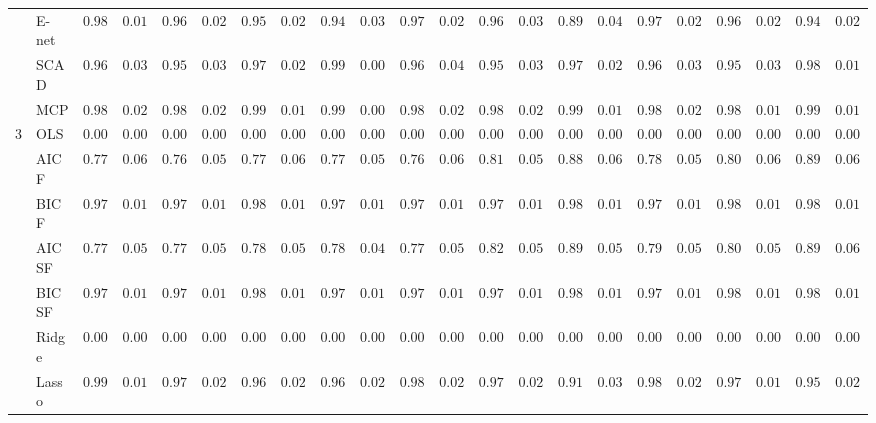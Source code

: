 \begin{tabular}{ll|ll|llllll|llllll|llllll}
 & E-net  & $0.9854$ & $0.0169$ & $0.9659$ & $0.0285$ & $0.9578$ & $0.0271$ & $0.9473$ & $0.0322$ & $0.9791$ & $0.0264$ & $0.9686$ & $0.0318$ & $0.8998$ & $0.0403$ & $0.9785$ & $0.0206$ & $0.9619$ & $0.0238$ & $0.9473$ & $0.0277$ \\
 & SCAD  & $0.9625$ & $0.0383$ & $0.9567$ & $0.0374$ & $0.9760$ & $0.0254$ & $0.9979$ & $0.0066$ & $0.9601$ & $0.0460$ & $0.9581$ & $0.0377$ & $0.9772$ & $0.0299$ & $0.9624$ & $0.0372$ & $0.9585$ & $0.0322$ & $0.9874$ & $0.0170$ \\
 & MCP  & $0.9866$ & $0.0200$ & $0.9861$ & $0.0229$ & $0.9942$ & $0.0116$ & $0.9980$ & $0.0055$ & $0.9839$ & $0.0254$ & $0.9856$ & $0.0224$ & $0.9907$ & $0.0159$ & $0.9873$ & $0.0226$ & $0.9858$ & $0.0162$ & $0.9909$ & $0.0150$ \\\hline
3 & OLS  & $0.0000$ & $0.0000$ & $0.0000$ & $0.0000$ & $0.0000$ & $0.0000$ & $0.0000$ & $0.0000$ & $0.0000$ & $0.0000$ & $0.0000$ & $0.0000$ & $0.0000$ & $0.0000$ & $0.0000$ & $0.0000$ & $0.0000$ & $0.0000$ & $0.0000$ & $0.0000$ \\
 & AIC F  & $0.7760$ & $0.0636$ & $0.7662$ & $0.0549$ & $0.7760$ & $0.0629$ & $0.7783$ & $0.0557$ & $0.7682$ & $0.0619$ & $0.8160$ & $0.0554$ & $0.8895$ & $0.0673$ & $0.7869$ & $0.0525$ & $0.8017$ & $0.0635$ & $0.8929$ & $0.0670$ \\
 & BIC F  & $0.9732$ & $0.0155$ & $0.9789$ & $0.0179$ & $0.9805$ & $0.0177$ & $0.9783$ & $0.0150$ & $0.9760$ & $0.0174$ & $0.9793$ & $0.0139$ & $0.9889$ & $0.0121$ & $0.9786$ & $0.0155$ & $0.9833$ & $0.0159$ & $0.9896$ & $0.0121$ \\
 & AIC SF  & $0.7794$ & $0.0571$ & $0.7708$ & $0.0567$ & $0.7851$ & $0.0555$ & $0.7829$ & $0.0488$ & $0.7784$ & $0.0559$ & $0.8212$ & $0.0542$ & $0.8971$ & $0.0589$ & $0.7919$ & $0.0528$ & $0.8065$ & $0.0589$ & $0.8974$ & $0.0603$ \\
 & BIC SF  & $0.9736$ & $0.0148$ & $0.9791$ & $0.0174$ & $0.9807$ & $0.0175$ & $0.9782$ & $0.0151$ & $0.9760$ & $0.0174$ & $0.9795$ & $0.0137$ & $0.9890$ & $0.0122$ & $0.9786$ & $0.0156$ & $0.9834$ & $0.0157$ & $0.9896$ & $0.0121$ \\
 & Ridge  & $0.0000$ & $0.0000$ & $0.0000$ & $0.0000$ & $0.0000$ & $0.0000$ & $0.0000$ & $0.0000$ & $0.0000$ & $0.0000$ & $0.0000$ & $0.0000$ & $0.0000$ & $0.0000$ & $0.0000$ & $0.0000$ & $0.0000$ & $0.0000$ & $0.0000$ & $0.0000$ \\
 & Lasso  & $0.9900$ & $0.0144$ & $0.9769$ & $0.0245$ & $0.9694$ & $0.0268$ & $0.9690$ & $0.0243$ & $0.9864$ & $0.0226$ & $0.9774$ & $0.0291$ & $0.9120$ & $0.0362$ & $0.9833$ & $0.0209$ & $0.9719$ & $0.0193$ & $0.9556$ & $0.0236$ \\

\end{tabular}
